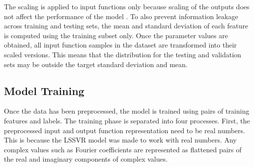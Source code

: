 The scaling is applied to input functions only because scaling of the outputs does not affect the performance of the model \autocite{ben-hurUsersGuideSupport2010}. To also prevent information leakage across training and testing sets, the mean and standard deviation of each feature is computed using the training subset only. Once the parameter values are obtained, all input function samples in the dataset are transformed into their scaled versions. This means that the distribution for the testing and validation sets may be outside the target standard deviation and mean. %

\subsection{Model Training}
\noindent Once the data has been preprocessed, the model is trained using pairs of training features and labels. The training phase is separated into four processes. First, the preprocessed input and output function representation need to be real numbers. This is because the LSSVR model was made to work with real numbers. Any complex values such as Fourier coefficients are represented as flattened pairs of the real and imaginary components of complex values. %

